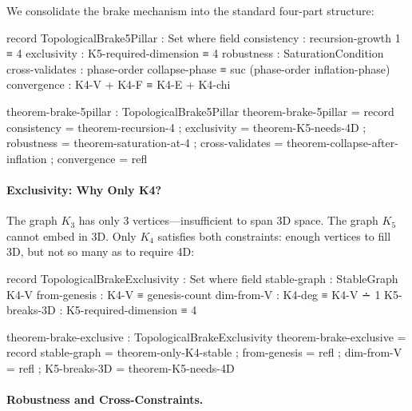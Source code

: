 \documentclass[11pt,a4paper]{book}
\begin{document}
We consolidate the brake mechanism into the standard four-part structure: 

\begin{code}
record TopologicalBrake5Pillar : Set where
  field
    consistency     : recursion-growth 1 ≡ 4
    exclusivity     : K5-required-dimension ≡ 4
    robustness      : SaturationCondition
    cross-validates : phase-order collapse-phase ≡ suc (phase-order inflation-phase)
    convergence     : K4-V + K4-F ≡ K4-E + K4-chi

theorem-brake-5pillar : TopologicalBrake5Pillar
theorem-brake-5pillar = record
  { consistency     = theorem-recursion-4
  ; exclusivity     = theorem-K5-needs-4D
  ; robustness      = theorem-saturation-at-4
  ; cross-validates = theorem-collapse-after-inflation
  ; convergence     = refl
  }
\end{code}

\paragraph{Exclusivity: Why Only K4?}

The graph $K_3$ has only 3 vertices—insufficient to span 3D space. The graph $K_5$ cannot 
embed in 3D. Only $K_4$ satisfies both constraints: enough vertices to fill 3D, but not so 
many as to require 4D:

\begin{code}
record TopologicalBrakeExclusivity : Set where
  field
    stable-graph          : StableGraph K4-V
    from-genesis          : K4-V ≡ genesis-count
    dim-from-V            : K4-deg ≡ K4-V ∸ 1
    K5-breaks-3D          : K5-required-dimension ≡ 4

theorem-brake-exclusive : TopologicalBrakeExclusivity
theorem-brake-exclusive = record
  { stable-graph = theorem-only-K4-stable
  ; from-genesis = refl
  ; dim-from-V = refl
  ; K5-breaks-3D = theorem-K5-needs-4D
  }
\end{code}

\paragraph{Robustness and Cross-Constraints.}
\end{document}
